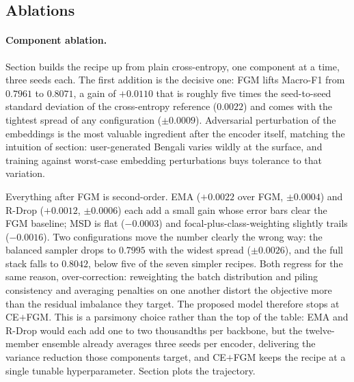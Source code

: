 \documentclass[11pt,a4paper]{article}
\def\Cref#1{Section}%
\def\cref#1{section}%
\begin{document}
\subsection{Ablations}
\label{sec:ablation-results}

\paragraph{Component ablation.} \Cref{tab:component} builds the recipe up from plain cross-entropy, one component at a time, three seeds each. The first addition is the decisive one: FGM lifts Macro-F1 from $0.7961$ to $0.8071$, a gain of $+0.0110$ that is roughly five times the seed-to-seed standard deviation of the cross-entropy reference ($0.0022$) and comes with the tightest spread of any configuration ($\pm0.0009$). Adversarial perturbation of the embeddings is the most valuable ingredient after the encoder itself, matching the intuition of \cref{sec:objective}: user-generated Bengali varies wildly at the surface, and training against worst-case embedding perturbations buys tolerance to that variation.

Everything after FGM is second-order. EMA ($+0.0022$ over FGM, $\pm0.0004$) and R-Drop ($+0.0012$, $\pm0.0006$) each add a small gain whose error bars clear the FGM baseline; MSD is flat ($-0.0003$) and focal-plus-class-weighting slightly trails ($-0.0016$). Two configurations move the number clearly the wrong way: the balanced sampler drops to $0.7995$ with the widest spread ($\pm0.0026$), and the full stack falls to $0.8042$, below five of the seven simpler recipes. Both regress for the same reason, over-correction: reweighting the batch distribution and piling consistency and averaging penalties on one another distort the objective more than the residual imbalance they target. The proposed model therefore stops at CE$+$FGM. This is a parsimony choice rather than the top of the table: EMA and R-Drop would each add one to two thousandths per backbone, but the twelve-member ensemble already averages three seeds per encoder, delivering the variance reduction those components target, and CE$+$FGM keeps the recipe at a single tunable hyperparameter. \Cref{fig:ablation} plots the trajectory.
\end{document}
